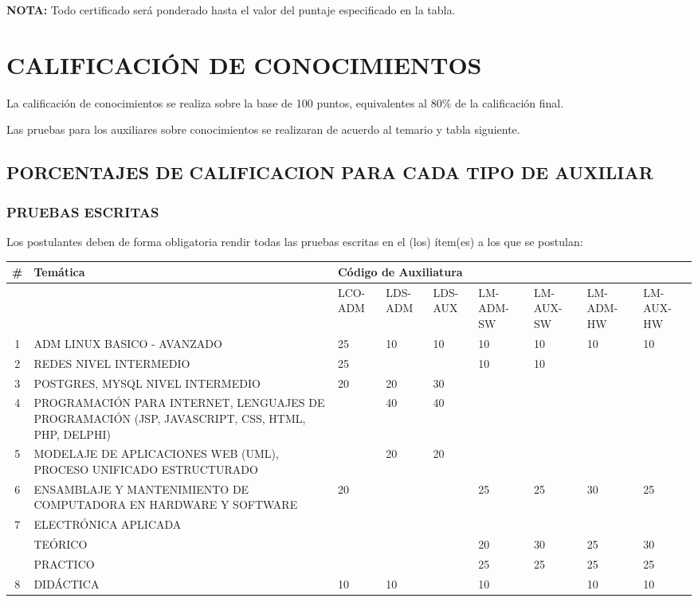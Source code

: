 \documentclass[letterpaper,11pt]{article}
\begin{document}
\textbf{NOTA:} Todo certificado será ponderado hasta el valor del puntaje especificado en la tabla.

\section{CALIFICACIÓN DE CONOCIMIENTOS}
La calificación de conocimientos se realiza sobre la base de 100 puntos, equivalentes al 80\% de la calificación final.

Las pruebas para los auxiliares sobre conocimientos se realizaran de acuerdo al temario y tabla siguiente.

\subsection{PORCENTAJES DE CALIFICACION PARA CADA TIPO DE AUXILIAR}

\subsubsection{PRUEBAS ESCRITAS}
Los postulantes deben de forma obligatoria rendir todas las pruebas escritas en el (los) ítem(es) a los que se postulan:

\begin{tabular}{|c|p{5.8cm}|p{0.8cm}|p{0.8cm}|p{0.8cm}|p{0.8cm}|p{0.8cm}|p{0.8cm}|p{0.8cm}|}
\hline
\# & Temática & \multicolumn{7}{|l|}{Código de Auxiliatura} \\
\hline
& & LCO-ADM & LDS-ADM & LDS-AUX & LM-ADM-SW & LM-AUX-SW & LM-ADM-HW & LM-AUX-HW \\
\hline
1 & ADM LINUX  BASICO - AVANZADO & 25 & 10 & 10 & 10 & 10 & 10 & 10 \\
\hline
2 & REDES NIVEL INTERMEDIO & 25 & & & 10 & 10 & & \\
\hline
3 & POSTGRES, MYSQL NIVEL INTERMEDIO & 20 & 20 & 30 & & & & \\
\hline
4 & PROGRAMACIÓN PARA INTERNET, LENGUAJES DE PROGRAMACIÓN (JSP, JAVASCRIPT, CSS, HTML, PHP, DELPHI) & & 40 & 40 & & & & \\
\hline
5 & MODELAJE DE APLICACIONES WEB (UML), PROCESO UNIFICADO ESTRUCTURADO & & 20 & 20 & & & & \\
\hline
6 & ENSAMBLAJE Y MANTENIMIENTO DE COMPUTADORA EN HARDWARE Y SOFTWARE & 20 & & & 25 & 25 & 30 & 25 \\
\hline
7 & ELECTRÓNICA APLICADA & & & & & & & \\
& TEÓRICO & & & & 20 & 30 & 25 & 30 \\
& PRACTICO & & & & 25 & 25 & 25 & 25 \\
\hline
8 & DIDÁCTICA & 10 & 10 & & 10 & & 10 & 10 \\
\hline
\end{tabular}
\end{document}
